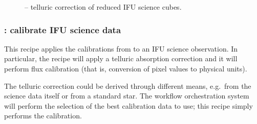 \begin{figure}[hb]
  \centering
    \def \globalscale {0.700000}
    \fontsize{10}{12}\selectfont
    
  \caption[Recipe: ]{
    -- telluric correction of reduced IFU science cubes.}
  \label{fig:metis_ifu_telluric}
\end{figure}



\clearpage
\subsubsection{: calibrate IFU science data}\label{rec:metis_ifu_calibrate}
\label{sssec:ifu_calibrate}

This recipe applies the calibrations from  to an
\ac{IFU} science observation.
In particular, the recipe will apply a telluric absorption correction and it
will perform flux calibration (that is, conversion of pixel values to physical
units).

The telluric correction could be derived through different means, e.g.~from
the science data itself or from a standard star.
The workflow orchestration system will perform the selection of the best
calibration data to use; this recipe simply performs the calibration.

